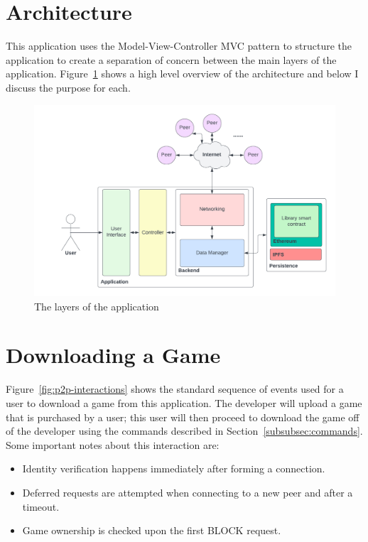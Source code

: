 \section{Architecture}

This application uses the Model-View-Controller MVC pattern to structure the application to create a separation of concern between the main layers of the application. Figure~\ref{fig:impl-layers} shows a high level overview of the architecture and below I discuss the purpose for each.

\begin{figure}[ht]
  \centering
  \includegraphics[width=.8\textwidth]{assets/images/diagrams/layers.png}
  \caption{The layers of the application}
  \label{fig:impl-layers}
\end{figure}






\newpage

\section{Downloading a Game}

Figure~\ref{fig:p2p-interactions} shows the standard sequence of events used for a user to download a game from this application. The developer will upload a game that is purchased by a user; this user will then proceed to download the game off of the developer using the commands described in Section~\ref{subsubsec:commands}.
\x
Some important notes about this interaction are:

\begin{itemize}
  \item Identity verification happens immediately after forming a connection.
  \item Deferred requests are attempted when connecting to a new peer and after a timeout.
  \item Game ownership is checked upon the first BLOCK request.
\end{itemize}

